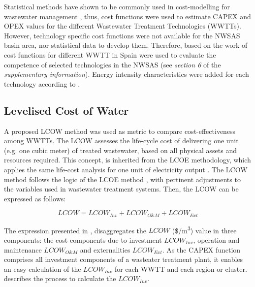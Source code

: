 Statistical methods have shown to be commonly used in cost-modelling for wastewater management \cite{Costmodellingwastewater2011,Assessmentwastewatertreatment2012,Economicfeasibility2012}, thus, cost functions were used to estimate CAPEX and OPEX values for the different Wastewater Treatment Technologies (WWTTs). However, technology specific cost functions were not available for the NWSAS basin area, nor statistical data to develop them. Therefore, based on the work of \citet{Assessmentwastewatertreatment2012} cost functions for different WWTT in Spain were used to evaluate the competence of selected technologies in the NWSAS (see \textit{section 6} of the \textit{supplementary information}). Energy intensity characteristics were added for each technology according to \cite{Energypatternanalysis2012,ComparativeAnalysisEnergy2017}.

% 

\subsection{Levelised Cost of Water}
A proposed LCOW method was used as metric to compare cost-effectiveness among WWTTs. The LCOW assesses the life-cycle cost of delivering one unit (e.g. one cubic meter) of treated wastewater, based on all physical assets and resources required. This concept, is inherited from the LCOE methodology, which applies the same life-cost analysis for one unit of electricity output \cite{prospectscostcompetitive2013}. The LCOW method follows the logic of the LCOE method \cite{prospectscostcompetitive2013,GeospatialLevelizedCost2015}, with pertinent adjustments to the variables used in wastewater treatment systems. Then, the LCOW can be expressed as follows:

\begin{equation}\label{eq:lcow}
LCOW = LCOW_{Inv} + LCOW_{O\&M} + LCOW_{Ext}
\end{equation}

The expression presented in , disaggregates the $LCOW$ (\$/m\textsuperscript{3}) value in three components: the cost components due to investment $LCOW_{Inv}$, operation and maintenance $LCOW_{O\&M}$ and externalities $LCOW_{Ext}$. As the CAPEX function comprises all investment components of a wasteater treatment plant, it enables an easy calculation of the $LCOW_{Inv}$ for each WWTT and each region or cluster.  describes the process to calculate the $LCOW_{Inv}$.

